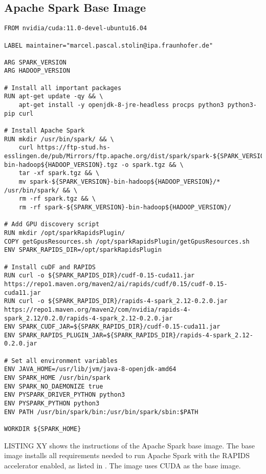 \subsection{Apache Spark Base Image}
\begin{lstlisting}[frame=single, label=lst:06_env_apache_base_dockerfile, caption=Dockerfile of the Apache Spark base image, captionpos=b]
FROM nvidia/cuda:11.0-devel-ubuntu16.04
 
LABEL maintainer="marcel.pascal.stolin@ipa.fraunhofer.de"
 
ARG SPARK_VERSION
ARG HADOOP_VERSION
 
# Install all important packages
RUN apt-get update -qy && \
    apt-get install -y openjdk-8-jre-headless procps python3 python3-pip curl
 
# Install Apache Spark
RUN mkdir /usr/bin/spark/ && \
    curl https://ftp-stud.hs-esslingen.de/pub/Mirrors/ftp.apache.org/dist/spark/spark-${SPARK_VERSION}/spark-${SPARK_VERSION}-bin-hadoop${HADOOP_VERSION}.tgz -o spark.tgz && \
    tar -xf spark.tgz && \
    mv spark-${SPARK_VERSION}-bin-hadoop${HADOOP_VERSION}/* /usr/bin/spark/ && \
    rm -rf spark.tgz && \
    rm -rf spark-${SPARK_VERSION}-bin-hadoop${HADOOP_VERSION}/
 
# Add GPU discovery script
RUN mkdir /opt/sparkRapidsPlugin/
COPY getGpusResources.sh /opt/sparkRapidsPlugin/getGpusResources.sh
ENV SPARK_RAPIDS_DIR=/opt/sparkRapidsPlugin
 
# Install cuDF and RAPIDS
RUN curl -o ${SPARK_RAPIDS_DIR}/cudf-0.15-cuda11.jar https://repo1.maven.org/maven2/ai/rapids/cudf/0.15/cudf-0.15-cuda11.jar
RUN curl -o ${SPARK_RAPIDS_DIR}/rapids-4-spark_2.12-0.2.0.jar https://repo1.maven.org/maven2/com/nvidia/rapids-4-spark_2.12/0.2.0/rapids-4-spark_2.12-0.2.0.jar
ENV SPARK_CUDF_JAR=${SPARK_RAPIDS_DIR}/cudf-0.15-cuda11.jar
ENV SPARK_RAPIDS_PLUGIN_JAR=${SPARK_RAPIDS_DIR}/rapids-4-spark_2.12-0.2.0.jar
 
# Set all environment variables
ENV JAVA_HOME=/usr/lib/jvm/java-8-openjdk-amd64
ENV SPARK_HOME /usr/bin/spark
ENV SPARK_NO_DAEMONIZE true
ENV PYSPARK_DRIVER_PYTHON python3
ENV PYSPARK_PYTHON python3
ENV PATH /usr/bin/spark/bin:/usr/bin/spark/sbin:$PATH
 
WORKDIR ${SPARK_HOME}
\end{lstlisting}


LISTING XY shows the instructions of the Apache Spark base image. The base image installs all requirements needed to run Apache Spark with the RAPIDS accelerator enabled, as listed in . The image uses CUDA as the base image. 


